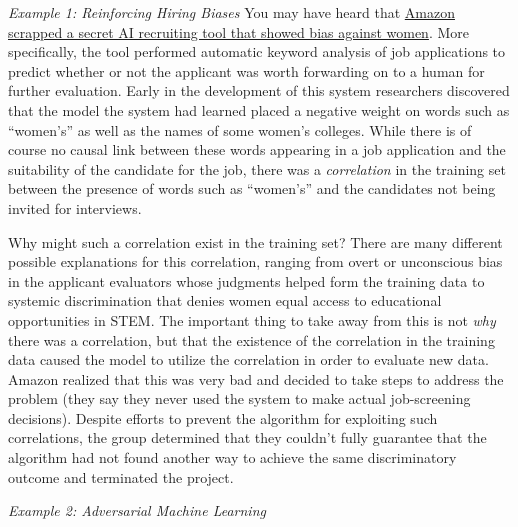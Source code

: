 \documentclass[assignment01_Solutions]{subfiles}
\begin{document}
\bi

\item \emph{Example 1: Reinforcing Hiring Biases}
You may have heard that \href{https://www.reuters.com/article/us-amazon-com-jobs-automation-insight/amazon-scraps-secret-ai-recruiting-tool-that-showed-bias-against-women-idUSKCN1MK08G}{Amazon scrapped a secret AI recruiting tool that showed bias against women}.  More specifically, the tool performed automatic keyword analysis of job applications to predict whether or not the applicant was worth forwarding on to a human for further evaluation.  Early in the development of this system researchers discovered that the model the system had learned placed a negative weight on words such as ``women's'' as well as the names of some women's colleges.  While there is of course no causal link between these words appearing in a job application and the suitability of the candidate for the job, there was a \emph{correlation} in the training set between the presence of words such as ``women's'' and the candidates not being invited for interviews.

Why might such a correlation exist in the training set?  There are many different possible explanations for this correlation, ranging from overt or unconscious bias in the applicant evaluators whose judgments helped form the training data to systemic discrimination that denies women equal access to educational opportunities in STEM.  The important thing to take away from this is not \emph{why} there was a correlation, but that the existence of the correlation in the training data caused the model to utilize the correlation in order to evaluate new data.  Amazon realized that this was very bad and decided to take steps to address the problem (they say they never used the system to make actual job-screening decisions).  Despite efforts to prevent the algorithm for exploiting such correlations, the group determined that they couldn't fully guarantee that the algorithm had not found another way to achieve the same discriminatory outcome and terminated the project.


\item \emph{Example 2: Adversarial Machine Learning}
\end{document}
